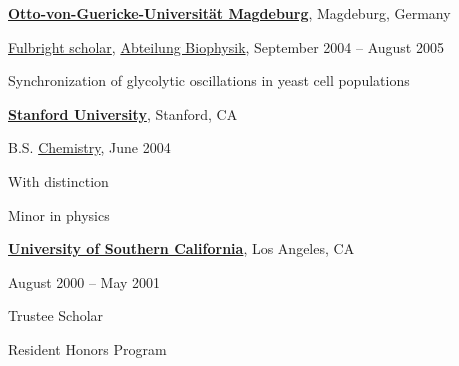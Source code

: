 \documentclass[10pt]{article}
\renewcommand{\section}[1]{\pagebreak[3]%
    \vspace{1.3\baselineskip}%
    \phantomsection\addcontentsline{toc}{section}{#1}%
    \noindent\llap{\scshape\smash{\parbox[t]{\marginparwidth}{\hyphenpenalty=10000\raggedright #1}}}%
    \vspace{-\baselineskip}\par}
\newcommand{\halfblankline}{\quad\vspace{-0.5\baselineskip}\pagebreak[3]}
\begin{document}
\halfblankline


\href{http://www.uni-magdeburg.de/en/home-p-1.html}{\textbf{Otto-von-Guericke-Universit\"{a}t
  Magdeburg}},
Magdeburg, Germany
\begin{outerlist}

\item[] \href{http://www.fulbright.de/togermany/}{Fulbright scholar},
        \href{http://www.biophysik.ovgu.de/}
             {Abteilung Biophysik}, September 2004 -- August 2005
        \begin{innerlist}
        \item Synchronization of glycolytic oscillations in yeast cell populations
        \end{innerlist}

\end{outerlist}

\halfblankline

\href{http://www.stanford.edu}{\textbf{Stanford University}},
Stanford, CA
\begin{outerlist}

\item[] B.S.
        \href{http://chemistry.stanford.edu/}
             {Chemistry}, 
             June 2004
        \begin{innerlist}
        \item With distinction
        \item Minor in physics
        \end{innerlist}

\end{outerlist}

\halfblankline

\href{http://www.usc.edu}{\textbf{University of Southern California}},
Los Angeles, CA
\begin{outerlist}

\item[] 
        August 2000 -- May 2001
        \begin{innerlist}
        \item Trustee Scholar
        \item Resident Honors Program
        \end{innerlist}

\end{outerlist}


%
\end{document}
